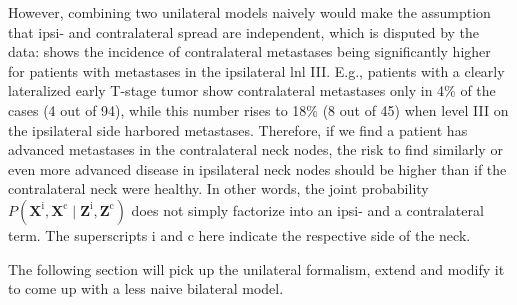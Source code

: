 \documentclass[\relativeRoot/main.tex]{subfiles}
\begin{document}
However, combining two unilateral models naively would make the assumption that ipsi- and contralateral spread are independent, which is disputed by the data:  shows the incidence of contralateral metastases being significantly higher for patients with metastases in the ipsilateral \gls{lnl} III. E.g., patients with a clearly lateralized early T-stage tumor show contralateral metastases only in 4\% of the cases (4 out of 94), while this number rises to 18\% (8 out of 45) when level III on the ipsilateral side harbored metastases. Therefore, if we find a patient has advanced metastases in the contralateral neck nodes, the risk to find similarly or even more advanced disease in ipsilateral neck nodes should be higher than if the contralateral neck were healthy. In other words, the joint probability $P \left( \mathbf{X}^\text{i}, \mathbf{X}^\text{c} \mid \mathbf{Z}^\text{i}, \mathbf{Z}^\text{c} \right)$ does not simply factorize into an ipsi- and a contralateral term. The superscripts $\text{i}$ and $\text{c}$ here indicate the respective side of the neck.

The following section will pick up the unilateral formalism, extend and modify it to come up with a less naive bilateral model.




\end{document}
